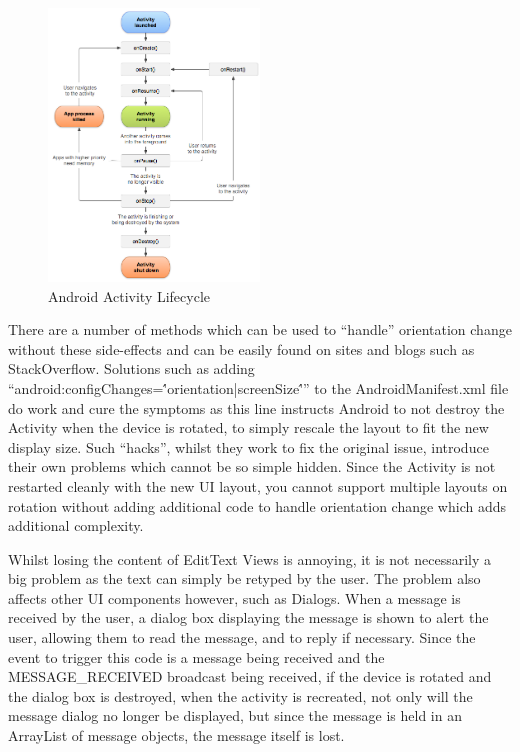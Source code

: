 \begin{figure}[!htpb]
	\centering
	\includegraphics[width=0.5\textwidth]{"screenshots/android_lifecycle"}
	\caption{Android Activity Lifecycle\cite{androidLifecycle}}
	\label{fig:android_lifecycle}
\end{figure}

\FloatBarrier

There are a number of methods which can be used to ``handle'' orientation change without these side-effects and can be easily found on sites and blogs such as StackOverflow\cite{norotation}.  Solutions such as adding ``android:configChanges=\''orientation|screenSize\'''' to the AndroidManifest.xml file do work and cure the symptoms as this line instructs Android to not destroy the Activity when the device is rotated, to simply rescale the layout to fit the new display size.  Such ``hacks'', whilst they work to fix the original issue, introduce their own problems which cannot be so simple hidden.  Since the Activity is not restarted cleanly with the new UI layout, you cannot support multiple layouts on rotation without adding additional code to handle orientation change which adds additional complexity.

Whilst losing the content of EditText Views is annoying, it is not necessarily a big problem as the text can simply be retyped by the user.  The problem also affects other UI components however, such as Dialogs\cite{androidDialogs}.  When a message is received by the user, a dialog box displaying the message is shown to alert the user, allowing them to read the message, and to reply if necessary.  Since the event to trigger this code is a message being received and the MESSAGE\_RECEIVED broadcast being received, if the device is rotated and the dialog box is destroyed, when the activity is recreated, not only will the message dialog no longer be displayed, but since the message is held in an ArrayList of message objects, the message itself is lost.

